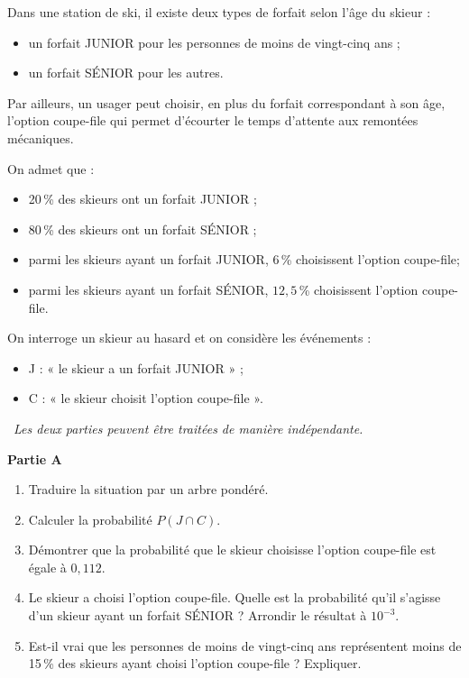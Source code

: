 Dans une station de ski, il existe deux types de forfait selon l'âge du skieur :

\begin{itemize}
	\item un forfait JUNIOR pour les personnes de moins de vingt-cinq ans ;
	\item un forfait SÉNIOR pour les autres.
\end{itemize}

Par ailleurs, un usager peut choisir, en plus du forfait correspondant à son âge, l'option coupe-file qui permet d'écourter le temps d'attente aux remontées mécaniques.

On admet que :

\begin{itemize}
	\item 20\,\% des skieurs ont un forfait JUNIOR ;
	\item 80\,\% des skieurs ont un forfait SÉNIOR ;
	\item parmi les skieurs ayant un forfait JUNIOR, 6\,\% choisissent l'option coupe-file;
	\item parmi les skieurs ayant un forfait SÉNIOR, $12,5$\,\% choisissent l'option coupe-file. 
\end{itemize}

On interroge un skieur au hasard et on considère les événements : 

\begin{itemize}
	\item J : « le skieur a un forfait JUNIOR » ;
	\item C : « le skieur choisit l'option coupe-file ».
\end{itemize}

\hfill~\textit{Les deux parties peuvent être traitées de manière indépendante.}\hfill~

\medskip

\textbf{\large Partie A}

\begin{enumerate}
	\item Traduire la situation par un arbre pondéré.
	\item Calculer la probabilité $P(J \cap C)$.
	\item Démontrer que la probabilité que le skieur choisisse l'option coupe-file est égale à $0,112$.
	\item Le skieur a choisi l'option coupe-file. Quelle est la probabilité qu'il s'agisse d'un skieur ayant un forfait SÉNIOR ? Arrondir le résultat à $10^{-3}$.
	\item Est-il vrai que les personnes de moins de vingt-cinq ans représentent moins de 15\,\% des skieurs ayant choisi l'option coupe-file ? Expliquer.
\end{enumerate}

